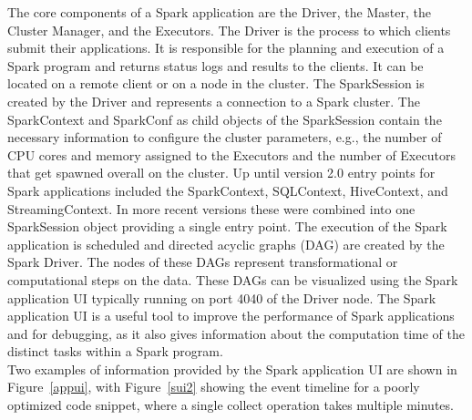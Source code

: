 \noindent The core components of a Spark application are the Driver, the Master, the Cluster Manager, and the Executors. The Driver is the process to which clients submit their applications. It is responsible for the planning and execution of a Spark program and returns status logs and results to the clients. It can be located on a remote client or on a node in the cluster. The SparkSession is created by the Driver and represents a connection to a Spark cluster. The SparkContext and SparkConf as child objects of the SparkSession contain the necessary information to configure the cluster parameters, e.g., the number of CPU cores and memory assigned to the Executors and the number of Executors that get spawned overall on the cluster. Up until version 2.0 entry points for Spark applications included the SparkContext, SQLContext, HiveContext, and StreamingContext. In more recent versions these were combined into one SparkSession object providing a single entry point.
The execution of the Spark application is scheduled and directed acyclic graphs (DAG) are created by the Spark Driver. The nodes of these DAGs represent transformational or computational steps on the data. These DAGs can be visualized using the Spark application UI typically running on port 4040 of the Driver node. The Spark application UI is a useful tool to improve the performance of Spark applications and for debugging, as it also gives information about the computation time of the distinct tasks within a Spark program.~\cite[pp. 45 ff]{sparkbook1}\\
Two examples of information provided by the Spark application UI are shown in Figure~\ref{appui}, with Figure~\ref{sui2} showing the event timeline for a poorly optimized code snippet, where a single collect operation takes multiple minutes.\\


